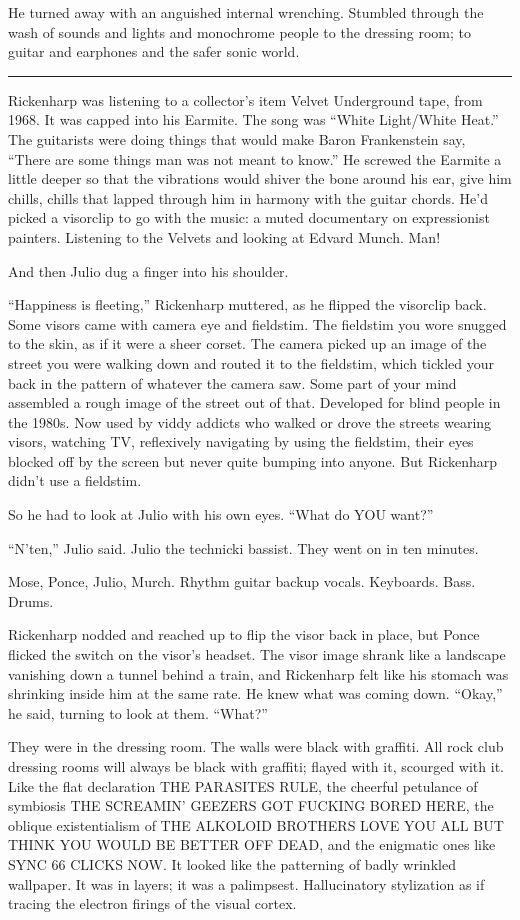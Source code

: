 He turned away with an anguished internal wrenching. Stumbled through the wash of sounds and lights and monochrome people to the dressing room; to guitar and earphones and the safer sonic world.

\fancybreak{* * *}

Rickenharp was listening to a collector's item Velvet Underground tape, from 1968. It was capped into his Earmite. The song was ``White Light/White Heat.'' The guitarists were doing things that would make Baron Frankenstein say, ``There are some things man was not meant to know.'' He screwed the Earmite a little deeper so that the vibrations would shiver the bone around his ear, give him chills, chills that lapped through him in harmony with the guitar chords. He'd picked a visorclip to go with the music: a muted documentary on expressionist painters. Listening to the Velvets and looking at Edvard Munch. Man!

And then Julio dug a finger into his shoulder.

``Happiness is fleeting,'' Rickenharp muttered, as he flipped the visorclip back. Some visors came with camera eye and fieldstim. The fieldstim you wore snugged to the skin, as if it were a sheer corset. The camera picked up an image of the street you were walking down and routed it to the fieldstim, which tickled your back in the pattern of whatever the camera saw. Some part of your mind assembled a rough image of the street out of that. Developed for blind people in the 1980s. Now used by viddy addicts who walked or drove the streets wearing visors, watching TV, reflexively navigating by using the fieldstim, their eyes blocked off by the screen but never quite bumping into anyone. But Rickenharp didn't use a fieldstim.

So he had to look at Julio with his own eyes. ``What do YOU want?''

``N'ten,'' Julio said. Julio the technicki bassist. They went on in ten minutes.

Mose, Ponce, Julio, Murch. Rhythm guitar backup vocals. Keyboards. Bass. Drums.

Rickenharp nodded and reached up to flip the visor back in place, but Ponce flicked the switch on the visor's headset. The visor image shrank like a landscape vanishing down a tunnel behind a train, and Rickenharp felt like his stomach was shrinking inside him at the same rate. He knew what was coming down. ``Okay,'' he said, turning to look at them. ``What?''

They were in the dressing room. The walls were black with graffiti. All rock club dressing rooms will always be black with graffiti; flayed with it, scourged with it. Like the flat declaration THE PARASITES RULE, the cheerful petulance of symbiosis THE SCREAMIN' GEEZERS GOT FUCKING BORED HERE, the oblique existentialism of THE ALKOLOID BROTHERS LOVE YOU ALL BUT THINK YOU WOULD BE BETTER OFF DEAD, and the enigmatic ones like SYNC 66 CLICKS NOW. It looked like the patterning of badly wrinkled wallpaper. It was in layers; it was a palimpsest. Hallucinatory stylization as if tracing the electron firings of the visual cortex.


